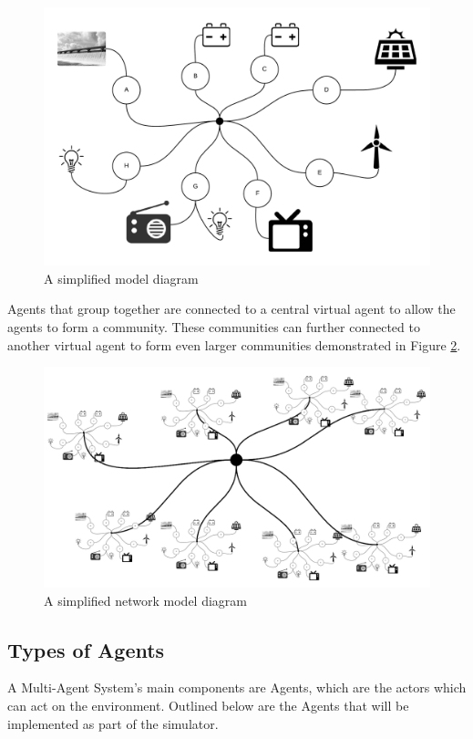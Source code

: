 \clearpage
\begin{figure}[h!]
	\centering
	\includegraphics[scale=0.8]{Images/Model.png}
	\caption{A simplified model diagram}
	\label{fig:SimpleModel}
\end{figure}

Agents that group together are connected to a central virtual agent to allow the agents to form a community. These communities can further connected to another virtual agent to form even larger communities demonstrated in Figure \ref{fig:SimpleModel2}. 

\begin{figure}[h!]
	\centering
	\includegraphics[scale = 0.9]{Images/Model2.png}
	\caption{A simplified network model diagram}
	\label{fig:SimpleModel2}
\end{figure}

\subsection*{Types of Agents}
A Multi-Agent System's main components are Agents, which are the actors which can act on the environment. Outlined below are the Agents that will be implemented as part of the simulator.
